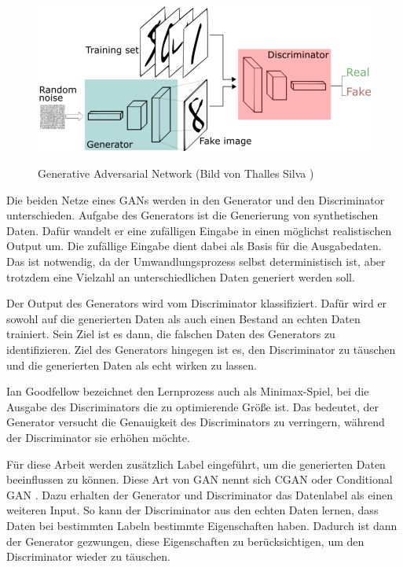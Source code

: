 \begin{figure}[H]
	\centering
	\includegraphics[width=12cm]{kapitel/2_stand_der_technik/img/GAN.png}
	\label{img:gan}
	\caption{Generative Adversarial Network (Bild von Thalles Silva \cite{img-gan})}
\end{figure}

Die beiden Netze eines GANs werden in den Generator und den Discriminator unterschieden.
Aufgabe des Generators ist die Generierung von synthetischen Daten.
Dafür wandelt er eine zufälligen Eingabe in einen möglichst realistischen Output um.
Die zufällige Eingabe dient dabei als Basis für die Ausgabedaten.
Das ist notwendig, da der Umwandlungsprozess selbst deterministisch ist, aber trotzdem eine Vielzahl an unterschiedlichen Daten generiert werden soll.
\newline

Der Output des Generators wird vom Discriminator klassifiziert.
Dafür wird er sowohl auf die generierten Daten als auch einen Bestand an echten Daten trainiert.
Sein Ziel ist es dann, die falschen Daten des Generators zu identifizieren.
Ziel des Generators hingegen ist es, den Discriminator zu täuschen und die generierten Daten als echt wirken zu lassen.
\newline

Ian Goodfellow bezeichnet den Lernprozess auch als Minimax-Spiel, bei die Ausgabe des Discriminators die zu optimierende Größe ist.
Das bedeutet, der Generator versucht die Genauigkeit des Discriminators zu verringern, während der Discriminator sie erhöhen möchte. \cite{gan-minimax} 
\newline


Für diese Arbeit werden zusätzlich Label eingeführt, um die generierten Daten beeinflussen zu können. 
Diese Art von GAN nennt sich CGAN oder Conditional GAN \cite{gan-conditional}.
Dazu erhalten der Generator und Discriminator das Datenlabel als einen weiteren Input.
So kann der Discriminator aus den echten Daten lernen, dass Daten bei bestimmten Labeln bestimmte Eigenschaften haben.
Dadurch ist dann der Generator gezwungen, diese Eigenschaften zu berücksichtigen, um den Discriminator wieder zu täuschen.

